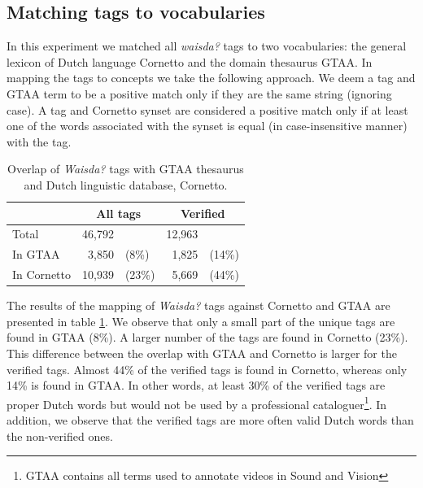 \subsection{Matching tags to vocabularies}
\label{tags-in-vocabularies}

In this experiment we matched all \emph{waisda?} tags to two vocabularies: the
general lexicon of Dutch language Cornetto and the domain thesaurus GTAA. In
mapping the tags to concepts we take the following approach. We deem a tag and
GTAA term to be a positive match only if they are the same string (ignoring
case). A tag and Cornetto synset are considered a positive match only if at
least one of the words associated with the synset is equal (in
case-insensitive manner) with the tag.

\begin{table}[tb]
\begin{footnotesize}
\centering
\begin{tabular*}{\columnwidth}{@{\extracolsep{\fill}}lrlrl}
\toprule
\T \B & \multicolumn{2}{c}{\textbf{All tags}} & \multicolumn{2}{c}{\textbf{Verified}} \\
\midrule
 Total \T \B & 46,792 && 12,963&\\
 In GTAA \B & 3,850 & (8\%) & 1,825 & (14\%)\\
 In Cornetto \B & 10,939 & (23\%) & 5,669 & (44\%)\\
\bottomrule
\end{tabular*}
\caption{Overlap of \emph{Waisda?} tags with GTAA thesaurus and Dutch linguistic database, Cornetto.}
\label{tab:overlap}
\end{footnotesize}
\end{table}

The results of the mapping of \emph{Waisda?} tags against Cornetto and GTAA
are presented in table \ref{tab:overlap}. We observe that only a small part of
the unique tags are found in GTAA (8\%). A larger number of the tags are found
in Cornetto (23\%). This difference between the overlap with GTAA and Cornetto
is larger for the verified tags. Almost 44\% of the verified tags is found in
Cornetto, whereas only 14\% is found in GTAA. In other words, at least 30\% of the
verified tags are proper Dutch words but would not be used by a professional
cataloguer\footnote{GTAA contains all terms used to annotate videos in Sound
and Vision}. In addition, we observe that the verified tags are more often
valid Dutch words than the non-verified ones.


